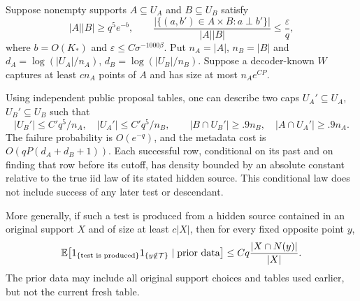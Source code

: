 \begin{lemma}\label{lem:fresh-test}
Suppose nonempty supports $A\subseteq U_A$ and $B\subseteq U_B$ satisfy
\[
 |A||B|\ge q^5e^{-b},\qquad
 \frac{|\{(a,b')\in A\times B:a\perp b'\}|}{|A||B|}
 \le\frac{\varepsilon}{q},
\]
where $b=O(K_*)$ and $\varepsilon\le C\sigma^{-1000\beta}$.
Put $n_A=|A|$, $n_B=|B|$ and
$d_A=\log(|U_A|/n_A)$, $d_B=\log(|U_B|/n_B)$.
Suppose a decoder-known $W$ captures at least $c n_A$ points of $A$
and has size at most $n_Ae^{CP}$.

Using independent public proposal tables, one can describe two caps
$U_A'\subseteq U_A$, $U_B'\subseteq U_B$ such that
\begin{equation}\label{eq:validated-caps}
 |U_B'|\le C'q^5/n_A,\quad |U_A'|\le C'q^5/n_B,
 \qquad |B\cap U_B'|\ge .9n_B,\quad |A\cap U_A'|\ge .9n_A.
\end{equation}
The failure probability is $O(e^{-q})$, and the metadata cost is
$O(qP(d_A+d_B+1))$.
Each successful row, conditional on its past and on finding that row
before its cutoff, has density bounded by an absolute constant relative
to the true iid law of its stated hidden source.  This conditional law
does not include success of any later test or descendant.

More generally, if such a test is produced from a hidden source
contained in an original support $X$ and of size at least $c|X|$, then
for every fixed opposite point $y$,
\begin{equation}\label{eq:fresh-test-domination}
 \mathbb E\bigl[1_{\{\text{test is produced}\}}
          1_{\{y\notin\mathcal T\}}\mid\text{prior data}\bigr]
 \le Cq\frac{|X\cap N(y)|}{|X|}.
\end{equation}
The prior data may include all original support choices and tables used
earlier, but not the current fresh table.
\end{lemma}

